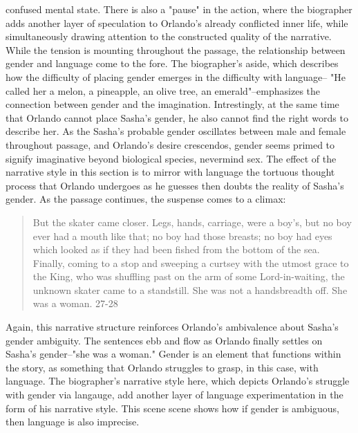 \documentclass[11pt]{article}
\begin{document}
confused mental state. There is also a "pause" in the action, where
the biographer adds another layer of speculation to Orlando's already
conflicted inner life, while simultaneously drawing attention to the
constructed quality of the narrative. While the tension is mounting
throughout the passage, the relationship between gender and language
come to the fore. The biographer's aside, which describes how the
difficulty of placing gender emerges in the difficulty with language--
"He called her a melon, a pineapple, an olive tree, an
emerald"--emphasizes the connection between gender and the
imagination. Intrestingly, at the same time that Orlando cannot place
Sasha's gender, he also cannot find the right words to describe
her. As the Sasha's probable gender oscillates between male and female
throughout passage, and Orlando's desire crescendos, gender seems
primed to signify imaginative beyond biological species, nevermind
sex. The effect of the narrative style in this section is to mirror
with language the tortuous thought process that Orlando undergoes as
he guesses then doubts the reality of Sasha's gender. As the passage
continues, the suspense comes to a climax:
\begin{quote}
But the skater came closer. Legs, hands, carriage, were a
boy's, but no boy ever had a mouth like that; no boy had those
breasts; no boy had eyes which looked as if they had been fished from
the bottom of the sea. Finally, coming to a stop and sweeping a
curtsey with the utmost grace to the King, who was shuffling past on
the arm of some Lord-in-waiting, the unknown skater came to a
standstill. She was not a handsbreadth off. She was a woman. 27-28
\end{quote}
Again, this narrative structure reinforces Orlando's ambivalence about
Sasha's gender ambiguity. The sentences ebb and flow as Orlando
finally settles on Sasha's gender--"she was a woman." Gender is an
element that functions within the story, as something that Orlando
struggles to grasp, in this case, with language. The biographer's
narrative style here, which depicts Orlando's struggle with gender via
langauge, add another layer of language experimentation in the form of
his narrative style. This scene scene shows how if gender is
ambiguous, then language is also imprecise.
\end{document}
